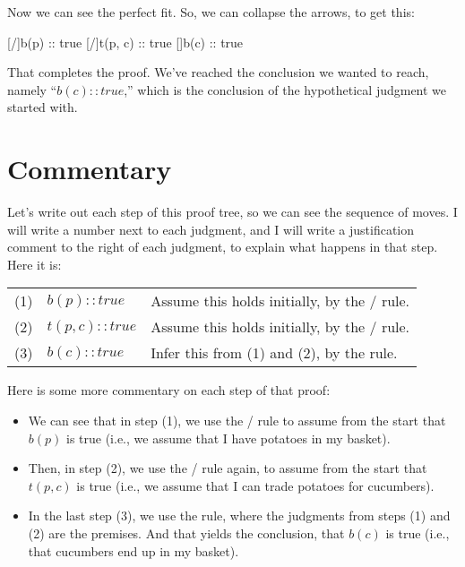 \documentclass[../../../main.tex]{subfiles}
\begin{document}
\noindent
Now we can see the perfect fit. So, we can collapse the arrows, to get this:

\begin{prooftree*}
  \hypo{}
  [\startrule/]{b(p) :: true}
  \hypo{}
  [\startrule/]{t(p, c) :: true}
  []{b(c) :: true}
\end{prooftree*}

\noindent
That completes the proof. We've reached the conclusion we wanted to reach, namely ``$b(c) :: true$,'' which is the conclusion of the hypothetical judgment we started with. 


\section{Commentary}

Let's write out each step of this proof tree, so we can see the sequence of moves. I will write a number next to each judgment, and I will write a justification comment to the right of each judgment, to explain what happens in that step. Here it is:

\begin{center}
\begin{tabular}{l  l  l}
  (1) & $b(p) :: true$ & Assume this holds initially, by the \startrule/ rule. \\
  (2) & $t(p, c) :: true$ & Assume this holds initially, by the \startrule/ rule. \\
  (3) & $b(c) :: true$ & Infer this from (1) and (2), by the {trade} rule.
\end{tabular}
\end{center}

\noindent
Here is some more commentary on each step of that proof:

\begin{itemize}
  \item{We can see that in step (1), we use the \startrule/ rule to assume from the start that $b(p)$ is true (i.e., we assume that I have potatoes in my basket).}
  \item{Then, in step (2), we use the \startrule/ rule again, to assume from the start that $t(p, c)$ is true (i.e., we assume that I can trade potatoes for cucumbers).}
  \item{In the last step (3), we use the  rule, where the judgments from steps (1) and (2) are the premises. And that yields the conclusion, that $b(c)$ is true (i.e., that cucumbers end up in my basket).}
\end{itemize}
\end{document}
